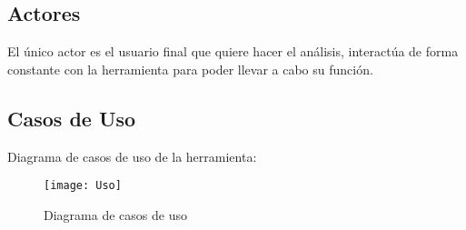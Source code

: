 \subsection{Actores}
El único actor es el usuario final que quiere hacer el análisis, interactúa de forma constante con la herramienta para poder llevar a cabo su función.

\subsection{Casos de Uso}
Diagrama de casos de uso de la herramienta:

\begin{figure}[H]
\centering
\texttt{[image: Uso]}
\caption{Diagrama de casos de uso}
\end{figure}

